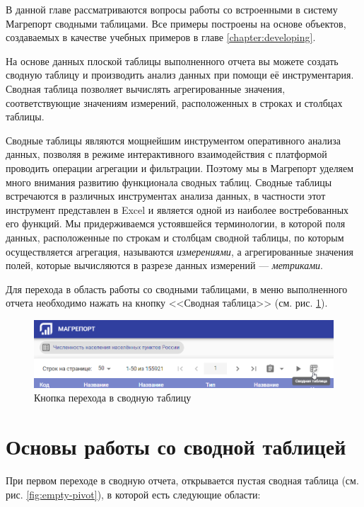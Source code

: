 \documentclass[../user-manual.tex]{subfiles}
\begin{document}
	В данной главе рассматриваются вопросы работы со встроенными в систему Магрепорт сводными таблицами. Все примеры построены на основе объектов, создаваемых в качестве учебных примеров в главе \ref{chapter:developing}.
	
	На основе данных плоской таблицы выполненного отчета вы можете создать сводную таблицу и производить анализ данных при помощи её инструментария. Сводная таблица позволяет вычислять агрегированные значения, соответствующие значениям измерений, расположенных в строках и столбцах таблицы.
	
	\begin{concept}
		Сводные таблицы являются мощнейшим инструментом оперативного анализа данных, позволяя в режиме интерактивного взаимодействия с платформой проводить операции агрегации и фильтрации. Поэтому мы в Магрепорт уделяем много внимания развитию функционала сводных таблиц. Сводные таблицы встречаются в различных инструментах анализа данных, в частности этот инструмент представлен в Excel и является одной из наиболее востребованных его функций. Мы придерживаемся устоявшейся терминологии, в которой поля данных, расположенные по строкам и столбцам сводной таблицы, по которым осуществляется агрегация, называются \textit{измерениями}, а агрегированные значения полей, которые вычисляются в разрезе данных измерений --- \textit{метриками}.
	\end{concept}
	
	Для перехода в область работы со сводными таблицами, в меню выполненного отчета необходимо нажать на кнопку <<Сводная таблица>> (см. рис. \ref{fig:open-pivot-button}).
	
	\begin{figure}[h]
		\centering
		\includegraphics[width=\graphicswidth]{img/1-open-pivot-button.png}
		\caption{Кнопка перехода в сводную таблицу}
		\label{fig:open-pivot-button}
	\end{figure}	
	
	\section{Основы работы со сводной таблицей}
	При первом переходе в сводную отчета, открывается пустая сводная таблица (см. рис. \ref{fig:empty-pivot}), в которой есть следующие области:
\end{document}
